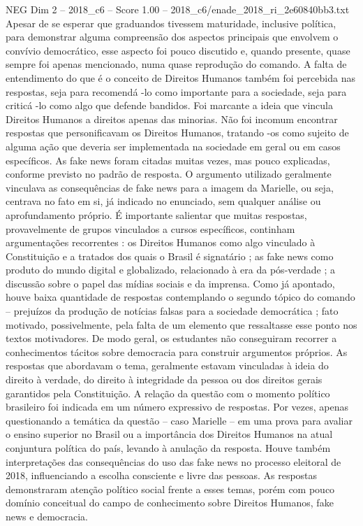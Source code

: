 \begin{textsample}{NEG Dim 2 – 2018\_c6 – Score 1.00 – 2018\_c6/enade\_2018\_ri\_2e60840bb3.txt}
Apesar de se esperar que graduandos tivessem maturidade, inclusive política, para demonstrar alguma compreensão dos aspectos principais que envolvem o convívio democrático, esse aspecto foi pouco discutido e, quando presente, quase sempre foi apenas mencionado, numa quase reprodução do comando.
A falta de entendimento do que é o conceito de Direitos Humanos também foi percebida nas respostas, seja para recomendá -lo como importante para a sociedade, seja para criticá -lo como algo que defende bandidos.
Foi marcante a ideia que vincula Direitos Humanos a direitos apenas das minorias.
Não foi incomum encontrar respostas que personificavam os Direitos Humanos, tratando -os como sujeito de alguma ação que deveria ser implementada na sociedade em geral ou em casos específicos.
As fake news foram citadas muitas vezes, mas pouco explicadas, conforme previsto no padrão de resposta.
O argumento utilizado geralmente vinculava as consequências de fake news para a imagem da Marielle, ou seja, centrava no fato em si, já indicado no enunciado, sem qualquer análise ou aprofundamento próprio.
É importante salientar que muitas respostas, provavelmente de grupos vinculados a cursos específicos, continham argumentações recorrentes : os Direitos Humanos como algo vinculado à Constituição e a tratados dos quais o Brasil é signatário ; as fake news como produto do mundo digital e globalizado, relacionado à era da pós-verdade ; a discussão sobre o papel das mídias sociais e da imprensa.
Como já apontado, houve baixa quantidade de respostas contemplando o segundo tópico do comando – prejuízos da produção de notícias falsas para a sociedade democrática ; fato motivado, possivelmente, pela falta de um elemento que ressaltasse esse ponto nos textos motivadores.
De modo geral, os estudantes não conseguiram recorrer a conhecimentos tácitos sobre democracia para construir argumentos próprios.
As respostas que abordavam o tema, geralmente estavam vinculadas à ideia do direito à verdade, do direito à integridade da pessoa ou dos direitos gerais garantidos pela Constituição.
A relação da questão com o momento político brasileiro foi indicada em um número expressivo de respostas.
Por vezes, apenas questionando a temática da questão – caso Marielle – em uma prova para avaliar o ensino superior no Brasil ou a importância dos Direitos Humanos na atual conjuntura política do país, levando à anulação da resposta.
Houve também interpretações das consequências do uso das fake news no processo eleitoral de 2018, influenciando a escolha consciente e livre das pessoas.
As respostas demonstraram atenção político social frente a esses temas, porém com pouco domínio conceitual do campo de conhecimento sobre Direitos Humanos, fake news e democracia.

\end{textsample}

